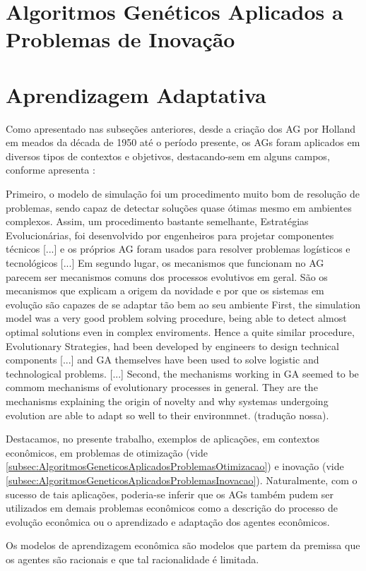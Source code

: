 \section{Algoritmos Genéticos Aplicados a Problemas de Inovação}
\label{subsec:AlgoritmosGeneticosAplicadosProblemasInovacao}

\section{Aprendizagem Adaptativa}

Como apresentado nas subseções anteriores, desde a criação dos AG por Holland em meados da década de 1950 até o período presente, os AGs foram aplicados em diversos tipos de contextos e objetivos, destacando-sem em alguns campos, conforme apresenta :

\citacao
	{%
		Primeiro, o modelo de simulação foi um procedimento muito bom de resolução de problemas, sendo capaz de detectar soluções quase ótimas mesmo em ambientes complexos. Assim, um procedimento bastante semelhante, Estratégias Evolucionárias, foi desenvolvido por engenheiros para projetar componentes técnicos [...] e os próprios AG foram usados para resolver problemas logísticos e tecnológicos [...] Em segundo lugar, os mecanismos que funcionam no AG parecem ser mecanismos comuns dos processos evolutivos em geral. São os mecanismos que explicam a origem da novidade e por que os sistemas em evolução são capazes de se adaptar tão bem ao seu ambiente
	}{%
		First, the simulation model was a very good problem solving procedure, being able to detect almost optimal solutions even in complex enviroments.  Hence a quite similar procedure, Evolutionary Strategies, had been developed by engineers to design technical components [...] and GA themselves have been used to solve logistic and technological problems. [...] Second, the mechanisms working in GA seemed to be commom mechanisms of evolutionary processes in general. They are the mechanisms explaining the origin of novelty and why systemas undergoing evolution are able to adapt so well to their environmnet.
	}
	{\citep[pg.3]{Geisendorf2007}}
	{(tradução nossa).}

Destacamos, no presente trabalho, exemplos de aplicações, em contextos econômicos, em problemas de otimização (vide \autoref{subsec:AlgoritmosGeneticosAplicadosProblemasOtimizacao}) e inovação (vide \autoref{subsec:AlgoritmosGeneticosAplicadosProblemasInovacao}). Naturalmente, com o sucesso de tais aplicações, poderia-se inferir que os AGs também pudem ser utilizados em demais problemas econômicos como a descrição do processo de evolução econômica ou o aprendizado e adaptação dos agentes econômicos.

Os modelos de aprendizagem econômica são modelos que partem da premissa que os agentes são racionais e que tal racionalidade é limitada.